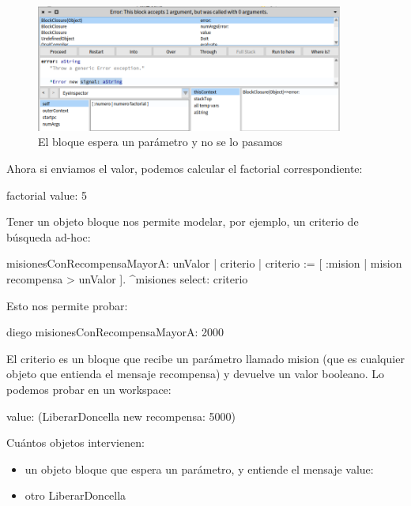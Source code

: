 \documentclass[a4paper,12pt]{book}
\begin{document}
\begin{figure}[h!]
    \centering	
    \includegraphics[width=0.9\textwidth]{images/17_error_bloque.png}
    \caption{El bloque espera un parámetro y no se lo pasamos}
\end{figure}
\FloatBarrier

Ahora si enviamos el valor, podemos calcular el factorial correspondiente:

\begin{code}
factorial value: 5
\end{code}

Tener un objeto bloque nos permite modelar, por ejemplo, un criterio de búsqueda ad-hoc:

\begin{code}
misionesConRecompensaMayorA: unValor
  | criterio |
  criterio := [ :mision | mision recompensa > unValor ].
  ^misiones select: criterio 
\end{code}

Esto nos permite probar:

\begin{code}
diego misionesConRecompensaMayorA: 2000
\end{code}

El criterio es un bloque que recibe un parámetro llamado mision (que es cualquier objeto que entienda el mensaje
recompensa) y devuelve un valor booleano. Lo podemos probar en un workspace:

\begin{code}
 value: (LiberarDoncella new recompensa: 5000)
\end{code}

Cuántos objetos intervienen:

\begin{itemize}
 \item un objeto bloque que espera un parámetro, y entiende el mensaje value:
 \item otro LiberarDoncella
\end{itemize}
\end{document}

